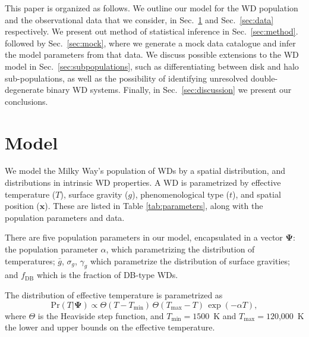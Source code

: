 \documentclass[fleqn,usenatbib]{mnras}
\newcommand{\popp}{\boldsymbol{\Psi}}
\newcommand{\Teff}{T}
\newcommand{\logg}{g}
\newcommand{\pr}{\text{Pr}}
\begin{document}
This paper is organized as follows. We outline our model for the WD population and the observational data that we consider, in Sec.~\ref{sec:model} and Sec.~\ref{sec:data} respectively. We present out method of statistical inference in Sec.~\ref{sec:method}.  followed by Sec.~\ref{sec:mock}, where we generate a mock data catalogue and infer the model parameters from that data. We discuss possible extensions to the WD model in Sec.~\ref{sec:subpopulations}, such as differentiating between disk and halo sub-populations, as well as the possibility of identifying unresolved double-degenerate binary WD systems. Finally, in Sec.~\ref{sec:discussion} we present our conclusions.





\section{Model}\label{sec:model}

We model the Milky Way's population of WDs by a spatial distribution, and distributions in intrinsic WD properties. A WD is parametrized by effective temperature ($\Teff$), surface gravity ($\logg$), phenomenological type ($t$), and spatial position ($\mathbf{x}$). These are listed in Table \ref{tab:parameters}, along with the population parameters and data.

There are five population parameters in our model, encapsulated in a vector $\popp$: the population parameter $\alpha$, which parametrizing the distribution of temperatures; $\bar{g}$, $\sigma_g$, $\gamma_g$ which parametrize the distribution of surface gravities; and $f_\text{DB}$ which is the fraction of DB-type WDs.

The distribution of effective temperature is parametrized as
\begin{equation}\label{eq:T}
    \pr(\Teff | \popp) \propto \Theta(\Teff - \Teff_\text{min})\, \Theta(\Teff_\text{max} - \Teff) \, \exp (-\alpha \Teff),
\end{equation}
where $\Theta$ is the Heaviside step function, and $\Teff_\text{min}=1500$~K and $\Teff_\text{max}=120$,000~K the lower and upper bounds on the effective temperature.
\end{document}
